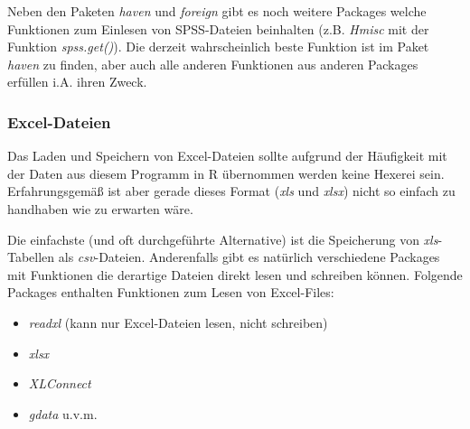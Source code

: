 \documentclass[]{article}
\newenvironment{Shaded}{\begin{snugshade}}{\end{snugshade}}
\newcommand{\KeywordTok}[1]{\textcolor[rgb]{0.13,0.29,0.53}{\textbf{#1}}}
\newcommand{\DataTypeTok}[1]{\textcolor[rgb]{0.13,0.29,0.53}{#1}}
\newcommand{\DecValTok}[1]{\textcolor[rgb]{0.00,0.00,0.81}{#1}}
\newcommand{\StringTok}[1]{\textcolor[rgb]{0.31,0.60,0.02}{#1}}
\newcommand{\OtherTok}[1]{\textcolor[rgb]{0.56,0.35,0.01}{#1}}
\newcommand{\OperatorTok}[1]{\textcolor[rgb]{0.81,0.36,0.00}{\textbf{#1}}}
\newcommand{\NormalTok}[1]{#1}
\providecommand{\tightlist}{%
  \setlength{\itemsep}{0pt}\setlength{\parskip}{0pt}}
\begin{document}
\begin{Shaded}
\end{Shaded}

Neben den Paketen \emph{haven} und \emph{foreign} gibt es noch weitere
Packages welche Funktionen zum Einlesen von SPSS-Dateien beinhalten
(z.B. \emph{Hmisc} mit der Funktion \emph{spss.get()}). Die derzeit
wahrscheinlich beste Funktion ist im Paket \emph{haven} zu finden, aber
auch alle anderen Funktionen aus anderen Packages erfüllen i.A. ihren
Zweck.

\subsubsection*{Excel-Dateien}\label{excel-dateien}

Das Laden und Speichern von Excel-Dateien sollte aufgrund der Häufigkeit
mit der Daten aus diesem Programm in R übernommen werden keine Hexerei
sein. Erfahrungsgemäß ist aber gerade dieses Format (\emph{xls} und
\emph{xlsx}) nicht so einfach zu handhaben wie zu erwarten wäre.

Die einfachste (und oft durchgeführte Alternative) ist die Speicherung
von \emph{xls}-Tabellen als \emph{csv}-Dateien. Anderenfalls gibt es
natürlich verschiedene Packages mit Funktionen die derartige Dateien
direkt lesen und schreiben können. Folgende Packages enthalten
Funktionen zum Lesen von Excel-Files:

\begin{itemize}
\tightlist
\item
  \emph{readxl} (kann nur Excel-Dateien lesen, nicht schreiben)
\item
  \emph{xlsx}
\item
  \emph{XLConnect}
\item
  \emph{gdata} u.v.m.
\end{itemize}
\end{document}
